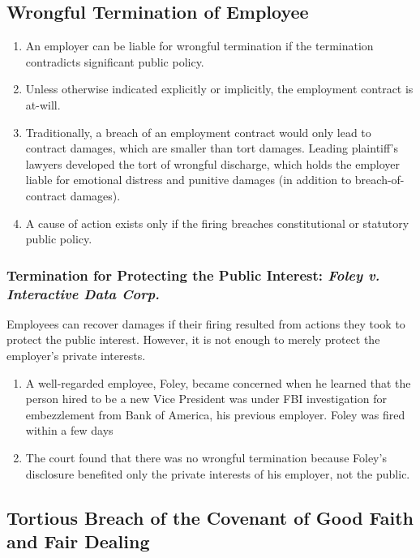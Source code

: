 \subsection{Wrongful Termination of Employee}

\begin{enumerate}
    \item An employer can be liable for wrongful termination if the 
    termination contradicts significant public policy.
    \item Unless otherwise indicated explicitly or implicitly, the employment 
    contract is at-will.
    \item Traditionally, a breach of an employment contract would only lead to 
    contract damages, which are smaller than tort damages. Leading plaintiff's 
    lawyers developed the tort of wrongful discharge, which holds the employer 
    liable for emotional distress and punitive damages (in addition to 
    breach-of-contract damages).
    \item A cause of action exists only if the firing breaches constitutional 
    or statutory public policy.
\end{enumerate}

\subsubsection{Termination for Protecting the Public Interest: \emph{Foley v. Interactive Data Corp.}}

Employees can recover damages if their firing resulted from actions they took 
to protect the public interest. However, it is not enough to merely protect 
the employer's private interests.

\begin{enumerate}
    \item A well-regarded employee, Foley, became concerned when he learned 
    that the person hired to be a new Vice President was under FBI 
    investigation for embezzlement from Bank of America, his previous 
    employer. Foley was fired within a few days
    \item The court found that there was no wrongful termination because Foley's 
    disclosure benefited only the private interests of his employer, not the 
    public.
\end{enumerate}

\subsection{Tortious Breach of the Covenant of Good Faith and Fair Dealing}

